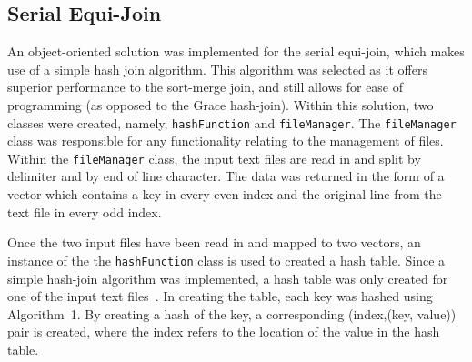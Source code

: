\documentclass[12pt,twocolumn]{witseiepaper}
\begin{document}
\subsection{Serial Equi-Join}
An object-oriented solution was implemented for the serial equi-join, which makes use of a simple hash join algorithm. This algorithm was selected as it offers superior performance to the sort-merge join, and still allows for ease of programming (as opposed to the Grace hash-join). Within this solution, two classes were created, namely, \texttt{hashFunction} and \texttt{fileManager}. The \texttt{fileManager} class was responsible for any functionality relating to the management of files. Within the \texttt{fileManager} class, the input text files are read in and split by delimiter and by end of line character. The data was returned in the form of a vector which contains a key in every even index and the original line from the text file in every odd index.

Once the two input files have been read in and mapped to two vectors, an instance of the the \texttt{hashFunction} class is used to created a hash table. Since a simple hash-join algorithm was implemented, a hash table was only created for one of the input text files~\cite{evaluating4JoinAlgorithms}. In creating the table, each key was hashed using Algorithm~1. By creating a hash of the key, a corresponding (index,(key, value)) pair is created, where the index refers to the location of the value in the hash table. 
\end{document}
